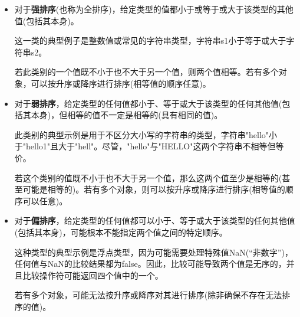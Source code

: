 \begin{itemize}
\item
对于\textbf{强排序}(也称为全排序)，给定类型的值都小于或等于或大于该类型的其他值(包括其本身)。

这一类的典型例子是整数值或常见的字符串类型，字符串s1小于等于或大于字符串s2。

若此类别的一个值既不小于也不大于另一个值，则两个值相等。若有多个对象，可以按升序或降序进行排序(相等值的顺序任意)。

\item
对于\textbf{弱排序}，给定类型的任何值都小于、等于或大于该类型的任何其他值(包括其本身)，但相等的值不一定是相等的(具有相同的值)。

此类别的典型示例是用于不区分大小写的字符串的类型，字符串"hello"小于"hello1"且大于"hell"。尽管，"hello"与"HELLO"这两个字符串不相等但等价。

若这个类别的值既不小于也不大于另一个值，那么这两个值至少是相等的(甚至可能是相等的)。若有多个对象，则可以按升序或降序进行排序(相等值的顺序可以任意)。

\item
对于\textbf{偏排序}，给定类型的任何值都可以小于、等于或大于该类型的任何其他值(包括其本身)，可能根本不能指定两个值之间的特定顺序。

这种类型的典型示例是浮点类型，因为可能需要处理特殊值NaN(“非数字”)，任何值与NaN的比较结果都为false。因此，比较可能导致两个值是无序的，并且比较操作符可能返回四个值中的一个。

若有多个对象，可能无法按升序或降序对其进行排序(除非确保不存在无法排序的值)。
\end{itemize}


